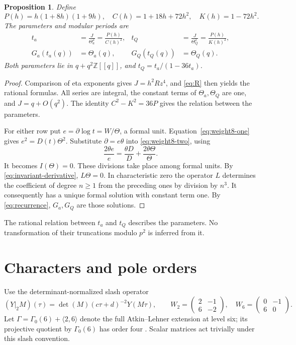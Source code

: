 \documentclass[11pt,a4paper]{article}
\newtheorem{proposition}[theorem]{Proposition}
\theoremstyle{remark}
\newcommand{\Z}{\mathbb Z}
\newcommand{\dd}{\partial}
\newcommand{\smat}[4]{\begin{pmatrix}#1&#2\\#3&#4\end{pmatrix}}
\newcommand{\Gbase}{\Gamma_0(6)}
\begin{document}
\begin{proposition}\label{prop:parameters}
Define
\[
 P(h)=h(1+8h)(1+9h),\quad
 C(h)=1+18h+72h^2,\quad K(h)=1-72h^2.
\]
The parameters and modular periods are
\begin{align}
 t_a&=\frac{J}{\Theta_a^2}=\frac{P(h)}{C(h)^2},&
 t_Q&=\frac{J}{\Theta_Q^2}=\frac{P(h)}{K(h)^2},\label{eq:modular-parameters}\\
 G_a(t_a(q))&=\Theta_a(q),&
 G_Q(t_Q(q))&=\Theta_Q(q).\label{eq:period-identification}
\end{align}
Both parameters lie in $q+q^2\Z[[q]]$, and
$t_Q=t_a/(1-36t_a)$.
\end{proposition}
\begin{proof}
Comparison of eta exponents gives $J=h^2Rz^4$, and \eqref{eq:R}
then yields the rational formulas. All series are integral, the
constant terms of $\Theta_a,\Theta_Q$ are one, and $J=q+O(q^2)$.
The identity $C^2-K^2=36P$ gives the relation between the parameters.

For either row put $e=\dd\log t=W/\Theta$, a formal unit.
Equation~\eqref{eq:weight8-one} gives
$e^2=D(t)\Theta^2$. Substitute $\dd=e\theta$ into
\eqref{eq:weight8-two}, using
\[
 \frac{2\theta e}{e}=\frac{\theta D}{D}
                         +\frac{2\theta\Theta}{\Theta}.
\]
It becomes $I(\Theta)=0$. These divisions take place among formal
units. By \eqref{eq:invariant-derivative}, $L\Theta=0$.
In characteristic zero the operator $L$ determines the coefficient
of degree $n\ge1$ from the preceding ones by division by $n^3$.
It consequently has a unique formal solution with constant term one.
By \eqref{eq:recurrence}, $G_a,G_Q$ are those solutions.
\end{proof}

The rational relation between $t_a$ and $t_Q$ describes the parameters.
No transformation of their truncations modulo $p^2$ is inferred from it.

\section{Characters and pole orders}\label{sec:characters}
Use the determinant-normalized slash operator
\[
 (Y|_2M)(\tau)=\det(M)(c\tau+d)^{-2}Y(M\tau),
 \qquad
 W_2=\smat{2}{-1}{6}{-2},\quad W_6=\smat{0}{-1}{6}{0}.
\]
Let $\Gamma=\Gamma_0(6)+\langle2,6\rangle$ denote the full
Atkin--Lehner extension at level six; its projective quotient by
$\Gbase$ has order four \cite[\S3]{beukers}. Scalar matrices act
trivially under this slash convention.
\end{document}
